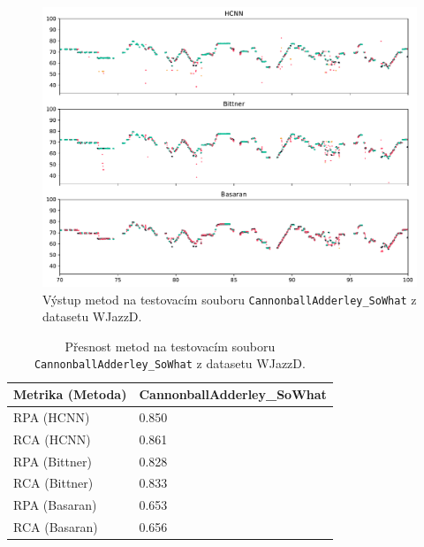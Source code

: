 \begin{figure}[h]\centering
\includegraphics[width=\textwidth,height=\textheight,keepaspectratio]{../img/vysledky/wjazzd_CannonballAdderley_SoWhat}
\caption{Výstup metod na testovacím souboru \texttt{CannonballAdderley\_SoWhat} z datasetu WJazzD.}
\label{obr:wjazzd_CannonballAdderley_SoWhat}
\end{figure}

\begin{table}[h]
\centering

\begin{tabular}{ll}
\toprule
Metrika (Metoda) & CannonballAdderley\_SoWhat \\
\midrule
      RPA (HCNN) &                     0.850 \\
      RCA (HCNN) &                     0.861 \\
   RPA (Bittner) &                     0.828 \\
   RCA (Bittner) &                     0.833 \\
   RPA (Basaran) &                     0.653 \\
   RCA (Basaran) &                     0.656 \\
\bottomrule
\end{tabular}

\caption{Přesnost metod na testovacím souboru \texttt{CannonballAdderley\_SoWhat} z datasetu WJazzD.}\label{tab:wjazzd_CannonballAdderley_SoWhat}
\end{table}


